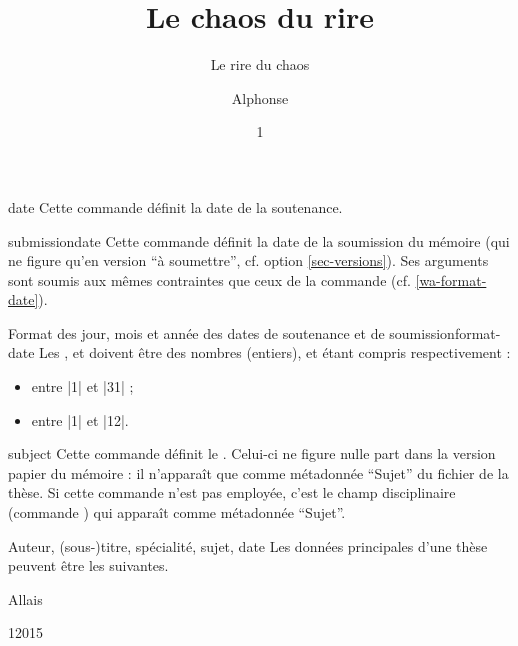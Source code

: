 %
\begin{docCommand}[doc description=\mandatory]{date}{}
  Cette commande définit la date de la soutenance.
\end{docCommand}
%
\begin{docCommand}{submissiondate}{}
  Cette commande définit la date de la soumission du mémoire (qui ne figure
  qu'en version \enquote{à soumettre}, cf. option 
  \vref{sec-versions}). Ses arguments sont soumis aux mêmes contraintes que ceux
  de la commande  (cf. \vref{wa-format-date}).
\end{docCommand}
%
\begin{dbwarning}{Format des jour, mois et année des dates de
    soutenance et de soumission}{format-date}
  Les ,  et  doivent être des nombres
  (entiers),  et  étant compris respectivement :
  \begin{itemize}
  \item entre |1| et |31| ;
  \item entre |1| et |12|.
  \end{itemize}
\end{dbwarning}
%
\begin{docCommand}{subject}{}
  Cette commande définit le .  Celui-ci ne figure nulle
  part dans la version papier du mémoire : il n'apparaît que comme métadonnée
  \enquote{Sujet} du fichier \pdf{} de la thèse. Si cette commande n'est pas
  employée, c'est le champ disciplinaire (commande ) qui
  apparaît comme métadonnée \enquote{Sujet}.
\end{docCommand}

\begin{dbexample}{Auteur, (sous-)titre, spécialité, sujet, date}{}
  Les données principales d'une thèse peuvent être les suivantes.
  \NoAutoSpacing%
\begin{preamblecode}[title=Par exemple dans le \File{\characteristicsfile},listing options={deletekeywords={author,title,subtitle,date},deletekeywords={[2]title},deletekeywords={[5]academicfield,speciality}}]
\author[aa@zygo.fr]{Alphonse}{Allais}
\title[Laugh's Chaos]{Le chaos du rire}
\subtitle[Chaos' laugh]{Le rire du chaos}
\date{1}{1}{2015}
\subject{Rire chaotique}
\end{preamblecode}
\end{dbexample}

